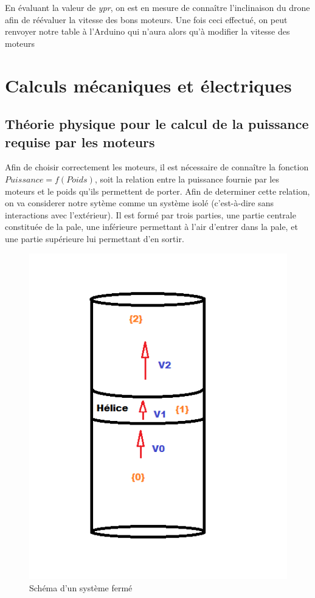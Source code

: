 \documentclass[a4paper,10pt]{report}
\begin{document}
	  En évaluant la valeur de \textit{ypr}, on est en mesure de connaître 
l'inclinaison du drone afin de réévaluer la vitesse des bons moteurs. Une fois 
ceci effectué, on peut renvoyer notre table à l'Arduino qui n'aura alors qu'à 
modifier la vitesse des moteurs
    
    \chapter{Calculs mécaniques et électriques}
      \section{Théorie physique pour le calcul de la puissance requise par les 
moteurs}
	Afin de choisir correctement les moteurs, il est nécessaire de 
connaître la fonction $Puissance = f(Poids)$, soit la relation entre la 
puissance fournie par les moteurs et le poids qu'ils permettent de porter. Afin 
de determiner cette relation, on va considerer notre sytème comme un système 
isolé (c'est-à-dire sans interactions avec l'extérieur). Il est formé par 
trois parties, une partie centrale constituée de la pale, une inférieure 
permettant à l'air d'entrer dans la pale, et une partie supérieure lui 
permettant d'en sortir. 

	  \begin{figure}[htbp]
	    \centering
	    \includegraphics[scale = 0.5]{img/systeme_isole.png}
	    \caption{Schéma d'un système fermé}
	    \label{systemisole}
	  \end{figure}
	  
\end{document}
